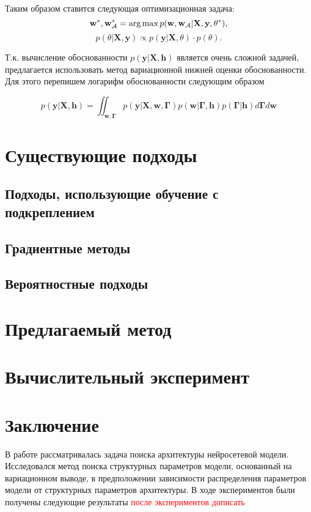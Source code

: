 \documentclass[12pt, twoside]{article}
\begin{document}
Таким образом ставится следующая оптимизационная задача:
$$\mathbf{w}^{*}, \mathbf{w^{*}_{\mathcal{A}}} = \argmax p(\mathbf{w}, \mathbf{w_{\mathcal{A}}}|\mathbf{X}, \mathbf{y}, \theta^{*}),$$
$$p(\theta|\mathbf{X}, \mathbf{y})\propto p(\mathbf{y}|\mathbf{X}, \theta)\cdot p(\theta).$$

Т.к. вычисление обоснованности $p(\mathbf{y}|\mathbf{X, h})$ является очень сложной задачей, предлагается использовать метод вариационной нижней оценки обоснованности. Для этого перепишем логарифм обоснованности следующим образом

$$p(\mathbf{y}|\mathbf{X, h}) = \iint_{\mathbf{w, \Gamma}} p(\mathbf{y}|\mathbf{X, w, \Gamma})p(\mathbf{w}|\mathbf{\Gamma, h})p(\mathbf{\Gamma}|\mathbf{h})d\mathbf{\Gamma}d\mathbf{w}$$

\section{Существующие подходы}
\subsection{Подходы, использующие обучение с подкреплением}

\subsection{Градиентные методы}

\subsection{Вероятностные подходы}

\section{Предлагаемый метод}

\section{Вычислительный эксперимент}


\section{Заключение}
В работе рассматривалась задача поиска архитектуры нейросетевой модели. Исследовался метод поиска структурных параметров модели, основанный на вариационном выводе, в предположении зависимости распределения параметров модели от структурных параметров архитектуры. В ходе экспериментов были получены следующие результаты \textcolor{red}{после экспериментов дописать}


\newpage


\end{document}
